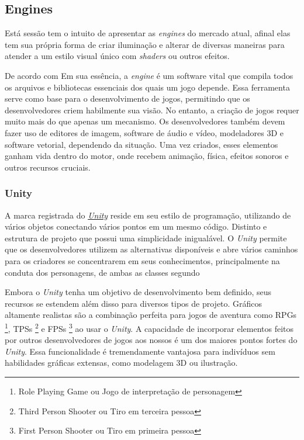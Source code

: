 \subsection{Engines}

Está sessão tem o intuito de apresentar as \textit{engines} do mercado atual, afinal elas tem sua própria forma de criar iluminação e alterar de diversas maneiras para atender a um estilo visual único com \textit{shaders} ou outros efeitos.

De acordo com \cite{Felipe2017-av} Em sua essência, a \textit{engine} é um software vital que compila todos os arquivos e bibliotecas essenciais dos quais um jogo depende. Essa ferramenta serve como base para o desenvolvimento de jogos, permitindo que os desenvolvedores criem habilmente sua visão.  No entanto, a criação de jogos requer muito mais do que apenas um mecanismo.  Os desenvolvedores também devem fazer uso de editores de imagem, software de áudio e vídeo, modeladores 3D e software vetorial, dependendo da situação.  Uma vez criados, esses elementos ganham vida dentro do motor, onde recebem animação, física, efeitos sonoros e outros recursos cruciais.

\subsubsection{Unity}
A marca registrada do \href{https://unity.com/pt}{\textit{Unity}} reside em seu estilo de programação, utilizando de vários objetos conectando vários pontos em um mesmo código. Distinto e estrutura de projeto que possui uma simplicidade inigualável.  O \textit{Unity} permite que os desenvolvedores utilizem as alternativas disponíveis e abre vários caminhos para os criadores se concentrarem em seus conhecimentos, principalmente na conduta dos personagens, de ambas as classes segundo \cite{Henrique2014-ka}

Embora o \textit{Unity} tenha um objetivo de desenvolvimento bem definido, seus recursos se estendem além disso para diversos tipos de projeto.  Gráficos altamente realistas são a combinação perfeita para jogos de aventura como RPGs \footnote{Role Playing Game ou Jogo de interpretação de personagem}, TPSs \footnote{Third Person Shooter ou Tiro em terceira pessoa} e FPSs \footnote{First Person Shooter ou Tiro em primeira pessoa} ao usar o \textit{Unity}.  A capacidade de incorporar elementos feitos por outros desenvolvedores de jogos aos nossos é um dos maiores pontos fortes do \textit{Unity}.  Essa funcionalidade é tremendamente vantajosa para indivíduos sem habilidades gráficas extensas, como modelagem 3D ou ilustração.

